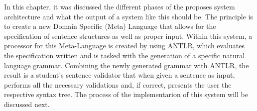 In this chapter, it was discussed the different phases of the proposes system architecture and what the output of a system like this should be.
The principle is to create a new Domain Specific (Meta) Language that allows for the specification of sentence structures as well as proper input.
Within this system, a processor for this Meta-Language is created by using \textsc{ANTLR},
which evaluates the specification written and is tasked with the generation of a specific natural language grammar.
Combining the newly generated grammar with \textsc{ANTLR}, the result is a student's sentence validator
that when given a sentence as input, performs all the necessary validations and, if correct, presents the user the respective syntax tree.
The process of the implementarion of this system will be discussed next.
